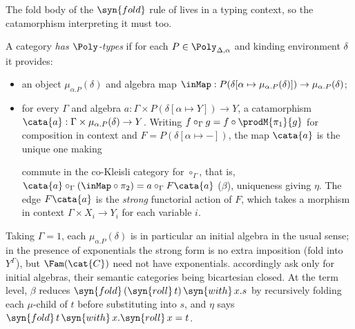 The fold body of the $\syn{fold}$ rule of  lives in a typing context,
so the catamorphism interpreting it must too.

\begin{definition}
\label{def:polynomial-types:has-poly}
A category \emph{has $\Poly$-types} if for each $P \in \Poly_{\Delta,\alpha}$ and kinding environment $\delta$
it provides:
\begin{itemize}
\item an object $\mu_{\alpha.P}(\delta)$ and algebra map $\inMap : P(\delta[\alpha \mapsto
  \mu_{\alpha.P}(\delta)]) \to \mu_{\alpha.P}(\delta)$;
\item for every $\Gamma$ and algebra $a : \Gamma \times P(\delta[\alpha \mapsto Y]) \to Y$, a
  catamorphism $\cata{a} : \Gamma \times \mu_{\alpha.P}(\delta) \to Y$. Writing $f \circ_\Gamma g = f
  \circ \prodM{\pi_1}{g}$ for composition in context and $F = P(\delta[\alpha \mapsto -])$, the map
  $\cata{a}$ is the unique one making
  \begin{center}
  \end{center}
  commute in the co-Kleisli category for $\circ_\Gamma$, that is, $\cata{a} \circ_\Gamma (\inMap \circ
  \pi_2) = a \circ_\Gamma F\cata{a}$ ($\beta$), uniqueness giving $\eta$. The edge $F\cata{a}$ is the
  \emph{strong} functorial action of $F$, which takes a morphism in context $\Gamma \times X_i \to Y_i$
  for each variable $i$.
\end{itemize}
\end{definition}

\noindent Taking $\Gamma = 1$, each $\mu_{\alpha.P}(\delta)$ is in particular an initial algebra in the usual
sense; in the presence of exponentials the strong form is no extra imposition (fold into $Y^\Gamma$), but
$\Fam(\cat{C})$ need not have exponentials. \citet[Definition~6]{nunes2023} accordingly ask only for
initial algebras, their semantic categories being bicartesian closed. At the term level, $\beta$ reduces
$\syn{fold}\,(\syn{roll}\,t)\,\syn{with}\,x.s$ by recursively folding each $\mu$-child of $t$ before
substituting into $s$, and $\eta$ says $\syn{fold}\,t\,\syn{with}\,x.\syn{roll}\,x = t$.

